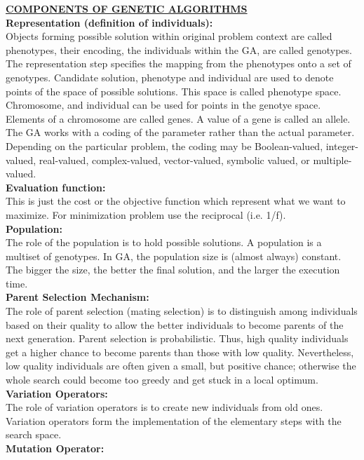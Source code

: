 \textbf{\underline{COMPONENTS OF GENETIC ALGORITHMS}}\\
\textbf{Representation (definition of individuals):}\\
Objects forming possible solution within original problem context are called phenotypes, their encoding, the individuals within the GA, are called genotypes.
The representation step specifies the mapping from the phenotypes onto a set of genotypes.
Candidate solution, phenotype and individual are used to denote points of the space of possible solutions. This space is called phenotype space.
Chromosome, and individual can be used for points in the genotye space.
Elements of a chromosome are called genes. A value of a gene is called an allele.
The GA works with a coding of the parameter rather than the actual parameter. Depending  on the particular  problem,  the  coding  may  be  Boolean-valued,  integer-valued,  real-valued,   complex-valued, vector-valued,  symbolic  valued,  or multiple-valued.
\\
\textbf{Evaluation function:}\\
This is just the cost or the objective function which represent what we want to maximize. For minimization problem use the reciprocal (i.e. 1/f).
\\
\textbf{Population:}\\
The role of the population is to hold possible solutions. A population is a multiset of genotypes. In GA, the population size is (almost always) constant. The bigger the size, the better the final solution, and the larger the execution time.
\\
\textbf{Parent Selection Mechanism:}\\
The role of parent selection (mating selection) is to distinguish among individuals based on their quality to allow the better individuals to become parents of the next generation.
Parent selection is probabilistic. Thus, high quality individuals get a higher chance to become parents than those with low quality. Nevertheless, low quality individuals are often given a small, but positive chance; otherwise the whole search could become too greedy and get stuck in a local optimum.
\\
\textbf{Variation Operators:}\\
The role of variation operators is to create new individuals from old ones. Variation operators form the implementation of the elementary steps with the search space.
\\
\textbf{Mutation Operator:}\\
